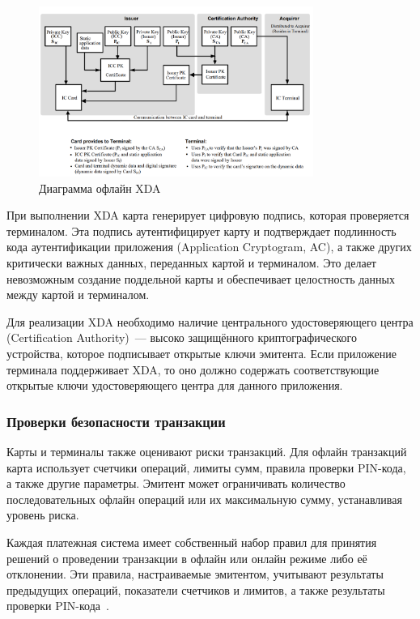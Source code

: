 \begin{figure}[H]
    \centering
    \includegraphics[width=0.8\textwidth]{images/research/emv_offline_xda}
    \caption{\centering Диаграмма офлайн XDA}
    \label{fig:emv_offline_xda}
\end{figure}


При выполнении XDA карта генерирует цифровую подпись, которая проверяется терминалом.
Эта подпись аутентифицирует карту и подтверждает подлинность кода аутентификации приложения (Application Cryptogram, AC), а также других критически важных данных, переданных картой и терминалом.
Это делает невозможным создание поддельной карты и обеспечивает целостность данных между картой и терминалом.

Для реализации XDA необходимо наличие центрального удостоверяющего центра (Certification Authority)~--- высоко защищённого криптографического устройства, которое подписывает открытые ключи эмитента.
Если приложение терминала поддерживает XDA, то оно должно содержать соответствующие открытые ключи удостоверяющего центра для данного приложения.

\subsubsection{Проверки безопасности транзакции}
\label{subsubsec:transaction_security_check}

Карты и терминалы также оценивают риски транзакций.
Для офлайн транзакций карта использует счетчики операций, лимиты сумм, правила проверки PIN-кода, а также другие параметры.
Эмитент может ограничивать количество последовательных офлайн операций или их максимальную сумму, устанавливая уровень риска.

Каждая платежная система имеет собственный набор правил для принятия решений о проведении транзакции в офлайн или онлайн режиме либо её отклонении.
Эти правила, настраиваемые эмитентом, учитывают результаты предыдущих операций, показатели счетчиков и лимитов, а также результаты проверки PIN-кода~\cite{secure_nfc_mc}.


